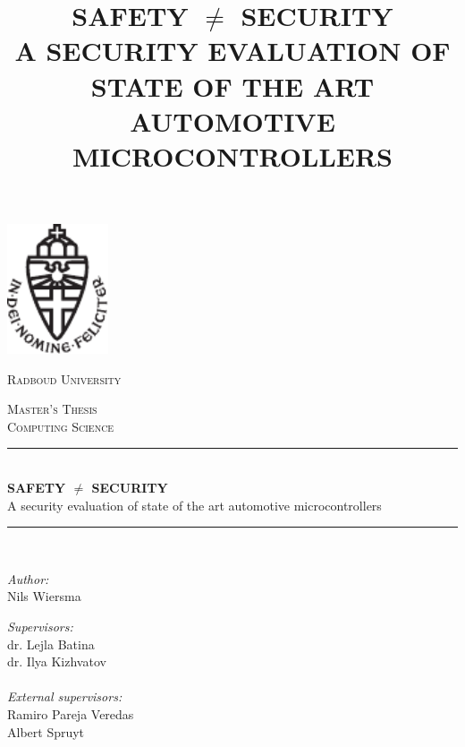 \documentclass[10pt]{article}
\title{SAFETY $\neq$ SECURITY \\ A SECURITY EVALUATION OF STATE OF THE ART AUTOMOTIVE MICROCONTROLLERS}
\author{}
\date{}
\begin{document}

\begin{titlepage}
  \begin{center}

  \vspace*{-2cm}

  \includegraphics[width=3cm]{rulogo_notext.pdf}\\
  \vspace*{0.2cm}
  {\scshape\LARGE Radboud University\par}\vspace{1.5cm} %

  \textsc{\Large Master's Thesis \\ Computing Science}\\[1.5cm] %

  \vspace{0.4cm}\noindent\rule{\textwidth}{0.4pt} \vspace{0.6cm}\\
  {\huge \bfseries SAFETY $\neq$ SECURITY}\\{\LARGE A security evaluation of state of the art automotive microcontrollers \\} 
  \vspace{0.6cm} \noindent\rule{\textwidth}{0.4pt}\vspace{1cm} \\
   
  \begin{minipage}[t]{0.4\textwidth}
  \begin{flushleft} \large
  \emph{Author:}\\
  Nils Wiersma \\
  \end{flushleft}
  \end{minipage}
  \begin{minipage}[t]{0.5\textwidth}
  \begin{flushright} \large
  \emph{Supervisors:} \\
  dr. Lejla Batina \\
  dr. Ilya Kizhvatov \\ \ \\
  \emph{External supervisors:} \\
  Ramiro Pareja Veredas  \\
  Albert Spruyt \\
  \end{flushright}
  \end{minipage}\\
   

\end{center}
\end{titlepage}
\end{document}

